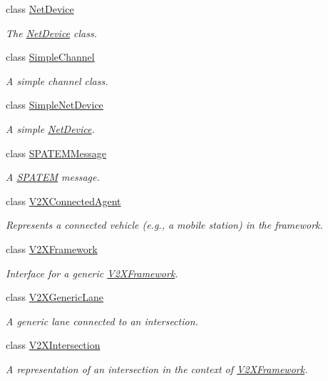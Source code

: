 \begin{DoxyCompactItemize}
class \hyperlink{classNetDevice}{Net\+Device}
\begin{DoxyCompactList}\small\item\em The \hyperlink{classNetDevice}{Net\+Device} class. \end{DoxyCompactList}\item 
class \hyperlink{classSimpleChannel}{Simple\+Channel}
\begin{DoxyCompactList}\small\item\em A simple channel class. \end{DoxyCompactList}\item 
class \hyperlink{classSimpleNetDevice}{Simple\+Net\+Device}
\begin{DoxyCompactList}\small\item\em A simple \hyperlink{classNetDevice}{Net\+Device}. \end{DoxyCompactList}\item 
class \hyperlink{classSPATEMMessage}{S\+P\+A\+T\+E\+M\+Message}
\begin{DoxyCompactList}\small\item\em A \hyperlink{structSPATEM}{S\+P\+A\+T\+EM} message. \end{DoxyCompactList}\item 
class \hyperlink{classV2XConnectedAgent}{V2\+X\+Connected\+Agent}
\begin{DoxyCompactList}\small\item\em Represents a connected vehicle (e.\+g., a mobile station) in the framework. \end{DoxyCompactList}\item 
class \hyperlink{classV2XFramework}{V2\+X\+Framework}
\begin{DoxyCompactList}\small\item\em Interface for a generic \hyperlink{classV2XFramework}{V2\+X\+Framework}. \end{DoxyCompactList}\item 
class \hyperlink{classV2XGenericLane}{V2\+X\+Generic\+Lane}
\begin{DoxyCompactList}\small\item\em A generic lane connected to an intersection. \end{DoxyCompactList}\item 
class \hyperlink{classV2XIntersection}{V2\+X\+Intersection}
\begin{DoxyCompactList}\small\item\em A representation of an intersection in the context of \hyperlink{classV2XFramework}{V2\+X\+Framework}. \end{DoxyCompactList}\item 

\end{DoxyCompactItemize}
